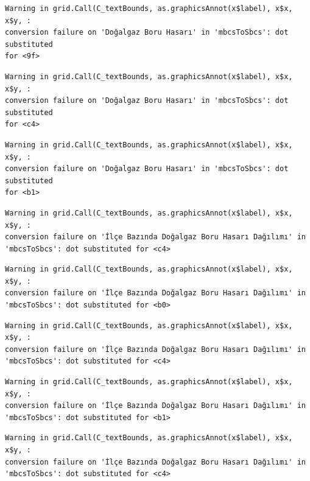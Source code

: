 \documentclass[
  11pt,
  a4paper,
  DIV=11,
  numbers=noendperiod]{scrartcl}
\begin{document}
\begin{verbatim}
Warning in grid.Call(C_textBounds, as.graphicsAnnot(x$label), x$x, x$y, :
conversion failure on 'Doğalgaz Boru Hasarı' in 'mbcsToSbcs': dot substituted
for <9f>
\end{verbatim}

\begin{verbatim}
Warning in grid.Call(C_textBounds, as.graphicsAnnot(x$label), x$x, x$y, :
conversion failure on 'Doğalgaz Boru Hasarı' in 'mbcsToSbcs': dot substituted
for <c4>
\end{verbatim}

\begin{verbatim}
Warning in grid.Call(C_textBounds, as.graphicsAnnot(x$label), x$x, x$y, :
conversion failure on 'Doğalgaz Boru Hasarı' in 'mbcsToSbcs': dot substituted
for <b1>
\end{verbatim}

\begin{verbatim}
Warning in grid.Call(C_textBounds, as.graphicsAnnot(x$label), x$x, x$y, :
conversion failure on 'İlçe Bazında Doğalgaz Boru Hasarı Dağılımı' in
'mbcsToSbcs': dot substituted for <c4>
\end{verbatim}

\begin{verbatim}
Warning in grid.Call(C_textBounds, as.graphicsAnnot(x$label), x$x, x$y, :
conversion failure on 'İlçe Bazında Doğalgaz Boru Hasarı Dağılımı' in
'mbcsToSbcs': dot substituted for <b0>
\end{verbatim}

\begin{verbatim}
Warning in grid.Call(C_textBounds, as.graphicsAnnot(x$label), x$x, x$y, :
conversion failure on 'İlçe Bazında Doğalgaz Boru Hasarı Dağılımı' in
'mbcsToSbcs': dot substituted for <c4>
\end{verbatim}

\begin{verbatim}
Warning in grid.Call(C_textBounds, as.graphicsAnnot(x$label), x$x, x$y, :
conversion failure on 'İlçe Bazında Doğalgaz Boru Hasarı Dağılımı' in
'mbcsToSbcs': dot substituted for <b1>
\end{verbatim}

\begin{verbatim}
Warning in grid.Call(C_textBounds, as.graphicsAnnot(x$label), x$x, x$y, :
conversion failure on 'İlçe Bazında Doğalgaz Boru Hasarı Dağılımı' in
'mbcsToSbcs': dot substituted for <c4>
\end{verbatim}
\end{document}
